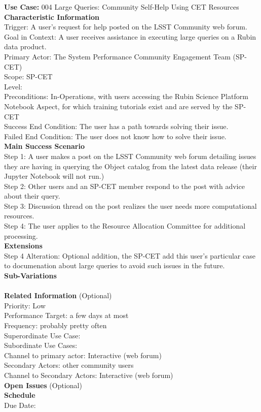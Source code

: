 {\bf Use Case:} 004 Large Queries: Community Self-Help Using CET Resources  \\

{\bf Characteristic Information} \\
Trigger: A user's request for help posted on the LSST Community web forum. \\
Goal in Context: A user receives assistance in executing large queries on a Rubin data product. \\
Primary Actor: The System Performance Community Engagement Team (SP-CET) \\
Scope: SP-CET \\
Level: \\
Preconditions: In-Operations, with users accessing the Rubin Science Platform Notebook Aspect, for which training tutorials exist and are served by the SP-CET \\
Success End Condition: The user has a path towards solving their issue. \\
Failed End Condition: The user does not know how to solve their issue. \\

{\bf Main Success Scenario} \\
Step 1: A user makes a post on the LSST Community web forum detailing issues they are having in querying the Object catalog from the latest data release (their Jupyter Notebook will not run.) \\
Step 2: Other users and an SP-CET member respond to the post with advice about their query. \\
Step 3: Discussion thread on the post realizes the user needs more computational resources. \\
Step 4: The user applies to the Resource Allocation Committee for additional processing. \\

{\bf Extensions} \\
Step 4 Alteration: Optional addition, the SP-CET add this user's particular case to documenation about large queries to avoid such issues in the future. \\

{\bf Sub-Variations} \\
\\

{\bf Related Information} (Optional) \\
Priority: Low  \\
Performance Target: a few days at most \\
Frequency: probably pretty often \\
Superordinate Use Case:  \\
Subordinate Use Cases: \\
Channel to primary actor: Interactive (web forum) \\
Secondary Actors: other community users \\
Channel to Secondary Actors: Interactive (web forum) \\

{\bf Open Issues} (Optional) \\

{\bf Schedule} \\
Due Date: \\
